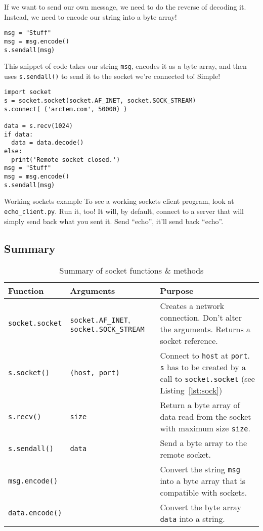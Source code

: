 \documentclass[11pt]{cselabheader}
\begin{document}
If we want to send our own message, we need to do the reverse of decoding it.
Instead, we need to encode our string into a byte array!

\begin{lstlisting}
msg = "Stuff"
msg = msg.encode()
s.sendall(msg)
\end{lstlisting}

This snippet of code takes our string \lstinline{msg}, encodes it as a byte
array, and then uses \lstinline{s.sendall()} to send it to the socket we're
connected to! Simple!

\begin{lstlisting}[style=python,label={lst:sock},caption={Code that shows usage, but does not
actually make sense}]
import socket
s = socket.socket(socket.AF_INET, socket.SOCK_STREAM)
s.connect( ('arctem.com', 50000) )

data = s.recv(1024)
if data:
  data = data.decode()
else:
  print('Remote socket closed.')
msg = "Stuff"
msg = msg.encode()
s.sendall(msg)
\end{lstlisting}


\begin{warningbox}{Working sockets example}
  To see a working sockets client program, look at
  \texttt{echo\_client.py}. Run it, too! It will, by default, connect to a
  server that will simply send back what you sent it. Send ``echo'', it'll send
  back ``echo''.
\end{warningbox}

\pagebreak
\subsection{Summary}

\begin{table}[!ht]
  \centering
  \begin{tabular}{p{2.5cm} p{3.3cm} p{10cm}}
    \toprule
    \bfseries Function & \bfseries Arguments & \bfseries Purpose \\
    \midrule
    \lstinline!socket.socket! & \lstinline!socket.AF_INET!, \lstinline!socket.SOCK_STREAM! &
    Creates a network connection. Don't alter the arguments. Returns a socket
    reference.\\
    \lstinline!s.socket()! & \lstinline!(host, port)! & Connect to
    \lstinline!host! at \lstinline!port!. \lstinline!s! has to be created by a
    call to \lstinline!socket.socket! (see Listing~\ref{lst:sock})\\
    \lstinline{s.recv()} & \lstinline{size} & Return a byte array of data read from the
    socket with maximum size \lstinline{size}.\\
    \lstinline{s.sendall()} & \lstinline{data} & Send a byte array to the remote socket.\\
    \lstinline!msg.encode()! & & Convert the string \lstinline{msg} into a byte array
    that is compatible with sockets.\\
    \lstinline!data.encode()! & & Convert the byte array \lstinline{data} into a string.\\
    \bottomrule
  \end{tabular}
  \caption{Summary of socket functions \& methods}
  \label{tab:sum}
\end{table}
\end{document}
